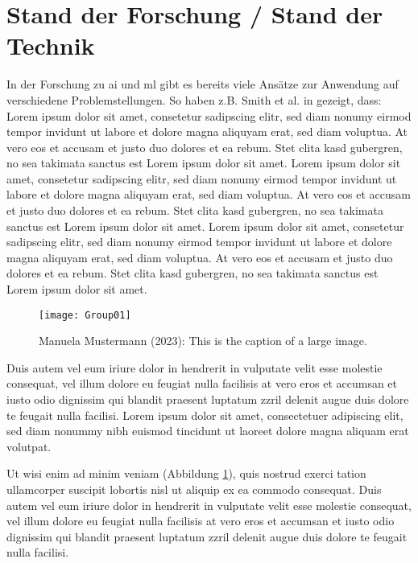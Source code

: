 \documentclass[9pt,a4paper,ngerman]{extarticle}
\begin{document}
\part{Stand der Forschung / Stand der Technik}\label{sec:stand}
In der Forschung zu \gls{ai} und \gls{ml} gibt es bereits viele Ansätze zur Anwendung auf verschiedene Problemstellungen. So haben z.B. Smith et al. in \cite{smith2018} gezeigt, dass:
Lorem ipsum dolor sit amet, consetetur sadipscing elitr, sed diam nonumy eirmod tempor invidunt ut labore et dolore magna aliquyam erat, sed diam voluptua. At vero eos et accusam et justo duo dolores et ea rebum. Stet clita kasd gubergren, no sea takimata sanctus est Lorem ipsum dolor sit amet. Lorem ipsum dolor sit amet, consetetur sadipscing elitr, sed diam nonumy eirmod tempor invidunt ut labore et dolore magna aliquyam erat, sed diam voluptua. At vero eos et accusam et justo duo dolores et ea rebum. Stet clita kasd gubergren, no sea takimata sanctus est Lorem ipsum dolor sit amet. Lorem ipsum dolor sit amet, consetetur sadipscing elitr, sed diam nonumy eirmod tempor invidunt ut labore et dolore magna aliquyam erat, sed diam voluptua. At vero eos et accusam et justo duo dolores et ea rebum. Stet clita kasd gubergren, no sea takimata sanctus est Lorem ipsum dolor sit amet.   

\begin{figure}
	\texttt{[image: Group01]}
	\caption{Manuela Mustermann (2023): This is the caption of a large image.}
	\label{fig:image-a}
\end{figure}

Duis autem vel eum iriure dolor in hendrerit in vulputate velit esse molestie consequat, vel illum dolore eu feugiat nulla facilisis at vero eros et accumsan et iusto odio dignissim qui blandit praesent luptatum zzril delenit augue duis dolore te feugait nulla facilisi. Lorem ipsum dolor sit amet, consectetuer adipiscing elit, sed diam nonummy nibh euismod tincidunt ut laoreet dolore magna aliquam erat volutpat.   

Ut wisi enim ad minim veniam (Abbildung \ref{fig:image-a}), quis nostrud exerci tation ullamcorper suscipit lobortis nisl ut aliquip ex ea commodo consequat. Duis autem vel eum iriure dolor in hendrerit in vulputate velit esse molestie consequat, vel illum dolore eu feugiat nulla facilisis at vero eros et accumsan et iusto odio dignissim qui blandit praesent luptatum zzril delenit augue duis dolore te feugait nulla facilisi.\cite{jones2025}

\clearpage
\end{document}
